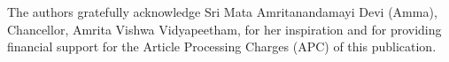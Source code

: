 \documentclass[pdflatex,sn-mathphys-num]{sn-jnl}%
\theoremstyle{thmstyleone}%
\theoremstyle{thmstyletwo}%
\theoremstyle{thmstylethree}%
\begin{document}
\backmatter


The authors gratefully acknowledge Sri Mata Amritanandamayi Devi (Amma), Chancellor, Amrita Vishwa Vidyapeetham, for her inspiration and for providing financial support for the Article Processing Charges (APC) of this publication.

\end{document}
